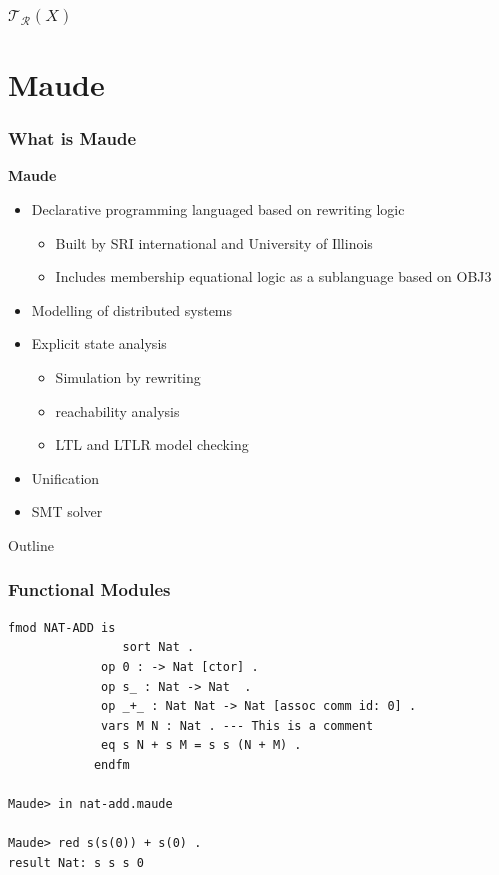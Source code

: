 \documentclass{beamer}
\begin{document}
\begin{frame}
    \frametitle{$\mathcal{T_R}(X)$}
\end{frame}
\section{Maude}
\begin{frame}
    \frametitle{What is Maude}
    \textbf{Maude}
    \begin{itemize}
        \pause
        \item Declarative programming languaged based on rewriting logic 
        \begin{itemize}
            \item Built by SRI international and University of Illinois
            \item Includes membership equational logic as a sublanguage based on OBJ3 
        \end{itemize}
        \pause
        \item Modelling of distributed systems 
        \pause 
        \item  Explicit state analysis 
        \begin{itemize}
            \item Simulation by rewriting 
            \item reachability analysis 
            \item LTL and LTLR model checking 
        \end{itemize}
        \pause 
        \item Unification 
        \item SMT solver
    \end{itemize}
\end{frame}
\begin{frame}{Outline}
\end{frame}
\begin{frame}[fragile]
    \frametitle{Functional Modules}
    \begin{lstlisting}[language=maude]
            fmod NAT-ADD is
                sort Nat .
             op 0 : -> Nat [ctor] .
             op s_ : Nat -> Nat  .
             op _+_ : Nat Nat -> Nat [assoc comm id: 0] .
             vars M N : Nat . --- This is a comment
             eq s N + s M = s s (N + M) .
            endfm

Maude> in nat-add.maude 

Maude> red s(s(0)) + s(0) .
result Nat: s s s 0

    \end{lstlisting}
\end{frame}
\end{document}
